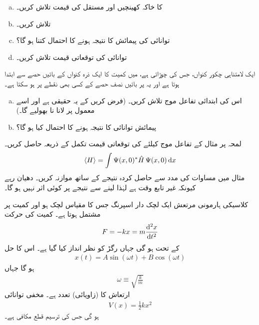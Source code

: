 \begin{enumerate}[a.]
\item 
{} کا خاکہ کھینچیں اور مستقل  کی قیمت تلاش کریں۔
\item  
{} تلاش کریں۔
\item  
توانائی کی پیمائش کا نتیجہ  ہونے کا احتمال کتنا ہو گا؟
\item 
توانائی کی توقعاتی قیمت تلاش کریں۔
\end{enumerate}
ایک لامتناہی چکور کنواں، جس کی چوڑائی  ہے، میں کمیت  کا ایک ذرہ کنواں کے بائیں حصے سے ابتدا ہوتا ہے اور یہ  پر بائیں نصف حصے کے کسی بھی نقطے پر ہو سکتا ہے۔
\begin{enumerate}[a.]
\item
اس کی ابتدائی تفاعل موج  تلاش کریں۔ (فرض کریں کے یہ حقیقی ہے اور اسے معمول پر لانا نا بھولیے گا۔)
\item 
پیمائش توانائی کا نتیجہ  ہونے کا احتمال کیا ہو گا؟ 
\end{enumerate} 
لمحہ   پر مثال  کے تفاعل موج کیلئے  کی توقعاتی قیمت تکمل کے ذریعہ حاصل کریں۔ 
\begin{align*}
\langle H \rangle=\int \Psi(x,0)^*\hat{H}\, \Psi(x,0)\dif x
\end{align*}
مثال  میں مساوات  کی مدد سے حاصل کردہ نتیجے کے ساتھ موازنہ کریں۔ دھیان رہے کیونکہ   غیر تابع وقت ہے لہٰذا  لینے سے نتیجے پر کوئی اثر نہیں ہو گا۔ 

کلاسیکی ہارمونی مرتعش ایک لچک دار اسپرنگ جس کا مقیاس لچک  ہو  اور  کمیت   پر مشتمل ہوتا ہے۔ کمیت کی حرکت  
\begin{align*}
F=-kx=m\frac{\dif{^{2}x}}{\dif{t^{2}}}
\end{align*}
کے تحت ہو گی جہاں رگڑ کو نظر انداز کیا گیا ہے۔ اس کا حل
\begin{align*}
x(t)=A\sin(\omega t)+B\cos(\omega t)
\end{align*}
ہو گا جہاں
\begin{align}\label{مساوات_شروڈنگر_زاویائی_تعدد}
\omega\equiv \sqrt{\frac{k}{m}}
\end{align}
ارتعاش کا (زاویائی) تعدد ہے۔ مخفی توانائی
\begin{align}
V(x)=\frac{1}{2}kx^{2}
\end{align}
ہو گی جس کی ترسیم قطع مکافی ہے۔ 

